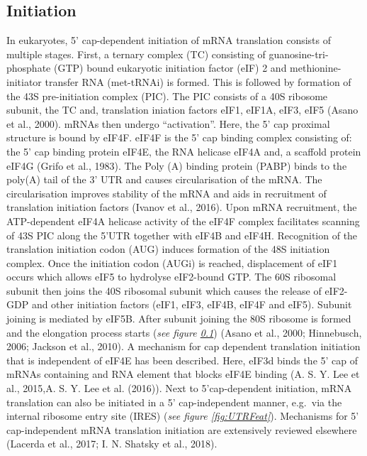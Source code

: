 \documentclass[12pt,openany]{book}
\begin{document}
\clearpage

\subsection{Initiation} \label{initiation}

In eukaryotes, 5' cap-dependent initiation of mRNA translation consists
of multiple stages. First, a ternary complex (TC) consisting of
guanosine-tri-phosphate (GTP) bound eukaryotic initiation factor (eIF) 2
and methionine-initiator transfer RNA (met-tRNAi) is formed. This is
followed by formation of the 43S pre-initiation complex (PIC). The PIC
consists of a 40S ribosome subunit, the TC and, translation iniation
factors eIF1, eIF1A, eIF3, eIF5 (Asano et al., 2000). mRNAs then undergo
``activation''. Here, the 5' cap proximal structure is bound by eIF4F.
eIF4F is the 5' cap binding complex consisting of: the 5' cap binding
protein eIF4E, the RNA helicase eIF4A and, a scaffold protein eIF4G
(Grifo et al., 1983). The Poly (A) binding protein (PABP) binds to the
poly(A) tail of the 3' UTR and causes circularisation of the mRNA. The
circularisation improves stability of the mRNA and aids in recruitment
of translation initiation factors (Ivanov et al., 2016). Upon mRNA
recruitment, the ATP-dependent eIF4A helicase activity of the eIF4F
complex facilitates scanning of 43S PIC along the 5'UTR together with
eIF4B and eIF4H. Recognition of the translation initiation codon (AUG)
induces formation of the 48S initiation complex. Once the initiation
codon (AUGi) is reached, displacement of eIF1 occurs which allows eIF5
to hydrolyse eIF2-bound GTP. The 60S ribosomal subunit then joins the
40S ribosomal subunit which causes the release of eIF2-GDP and other
initiation factors (eIF1, eIF3, eIF4B, eIF4F and eIF5). Subunit joining
is mediated by eIF5B. After subunit joining the 80S ribosome is formed
and the elongation process starts (\emph{see figure \ref{initiation}})
(Asano et al., 2000; Hinnebusch, 2006; Jackson et al., 2010). A
mechanism for cap dependent translation initiation that is independent
of eIF4E has been described. Here, eIF3d binds the 5' cap of mRNAs
containing and RNA element that blocks eIF4E binding (A. S. Y. Lee et
al., 2015,A. S. Y. Lee et al. (2016)). Next to 5'cap-dependent
initiation, mRNA translation can also be initiated in a 5'
cap-independent manner, e.g.~via the internal ribosome entry site (IRES)
(\emph{see figure \ref{fig:UTRFeat}}). Mechanisms for 5' cap-independent
mRNA translation initiation are extensively reviewed elsewhere (Lacerda
et al., 2017; I. N. Shatsky et al., 2018).
\end{document}
